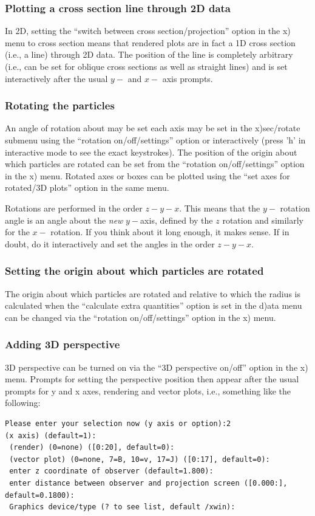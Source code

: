 \documentclass[a4paper,10pt]{article}
\begin{document}
\subsubsection{ Plotting a cross section line through 2D data}
 In 2D, setting the ``switch between cross section/projection'' option in the x) menu to cross section means that rendered plots are in fact a 1D cross section (i.e., a line) through 2D data. The position of the line is completely arbitrary (i.e., can be set for oblique cross sections as well as straight lines) and is set interactively after the usual $y-$ and $x-$ axis prompts.

\subsubsection{ Rotating the particles}
 An angle of rotation about may be set each axis may be set in the x)sec/rotate submenu using the ``rotation on/off/settings'' option or
interactively (press 'h' in interactive mode to see the exact keystrokes). The position of the origin about which particles are rotated can be set from the ``rotation on/off/settings'' option in the x) menu.
Rotated axes or boxes can be plotted using the ``set axes for rotated/3D plots'' option in the same menu.

Rotations are performed in the order $z-y-x$. This means that the $y-$ rotation angle is an angle about the \emph{new} $y-$axis, defined by the $z$ rotation and similarly for the $x-$ rotation. If you think about it long enough, it makes sense. If in doubt, do it interactively and set the angles in the order $z-y-x$.

\subsubsection{ Setting the origin about which particles are rotated}
 The origin about which particles are rotated and relative to which the radius is calculated when the ``calculate extra quantities'' option is set in the d)ata menu can be changed via the ``rotation on/off/settings'' option in the x) menu.

\subsubsection{ Adding 3D perspective}
\label{sec:3Dperspective}
 3D perspective can be turned on via the ``3D perspective on/off'' option in the x) menu. Prompts for setting the perspective position then appear after the usual prompts for y and x axes, rendering and vector plots, i.e., something like the following:
\begin{verbatim}
Please enter your selection now (y axis or option):2
(x axis) (default=1):
 (render) (0=none) ([0:20], default=0):
 (vector plot) (0=none, 7=B, 10=v, 17=J) ([0:17], default=0):
 enter z coordinate of observer (default=1.800):
 enter distance between observer and projection screen ([0.000:], default=0.1800):
 Graphics device/type (? to see list, default /xwin): 
\end{verbatim}
 
\end{document}
